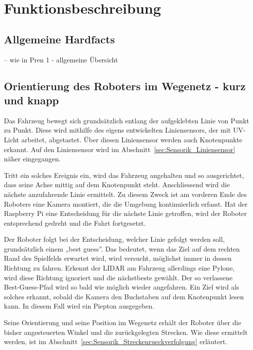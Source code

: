 \documentclass[main.tex]{subfiles} %
\begin{document}

\section{Funktionsbeschreibung}

\subsection{Allgemeine Hardfacts}

-- wie in Pren 1 - allgemeine Übersicht

\subsection{Orientierung des Roboters im Wegenetz - kurz und knapp}

Das Fahrzeug bewegt sich grundsätzlich entlang der aufgeklebten Linie von Punkt
zu Punkt. Diese wird mithilfe des eigens entwickelten Liniensensors, der mit
UV-Licht arbeitet, abgetastet. Über diesen Liniensensor werden auch
Knotenpunkte erkannt. Auf den Liniensensor wird im
Abschnitt~\ref{sec:Sensorik_Liniensensor} näher eingegangen.

Tritt ein solches Ereignis ein, wird das Fahrzeug angehalten und so
ausgerichtet, dass seine Achse mittig auf dem Knotenpunkt steht. Anschliessend
wird die nächste anzufahrende Linie ermittelt. Zu diesem Zweck ist am vorderen
Ende des Roboters eine Kamera montiert, die die Umgebung kontinuierlich
erfasst. Hat der Raspberry Pi eine Entscheidung für die nächste Linie
getroffen, wird der Roboter entsprechend gedreht und die Fahrt fortgesetzt.

Der Roboter folgt bei der Entscheidung, welcher Linie gefolgt werden soll,
grundsätzlich einem „best guess”. Das bedeutet, wenn das Ziel auf dem rechten
Rand des Spielfelds erwartet wird, wird versucht, möglichst immer in dessen
Richtung zu fahren. Erkennt der LIDAR am Fahrzeug allerdings eine Pylone, wird
diese Richtung ignoriert und die nächstbeste gewählt. Der so verlassene
Best-Guess-Pfad wird so bald wie möglich wieder angefahren. Ein Ziel wird als
solches erkannt, sobald die Kamera den Buchstaben auf dem Knotenpunkt lesen
kann. In diesem Fall wird ein Piepton ausgegeben.

Seine Orientierung und seine Position im Wegenetz erhält der Roboter über die
bisher angesteuerten Winkel und die zurückgelegten Strecken. Wie diese
ermittelt werden, ist im Abschnitt~\ref{sec:Sensorik_Streckenrueckverfolgung}
erläutert.
\end{document}
